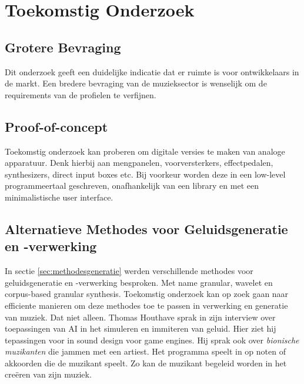 \section{Toekomstig Onderzoek}

\subsection{Grotere Bevraging}

Dit onderzoek geeft een duidelijke indicatie dat er ruimte is voor ontwikkelaars in de markt. Een bredere bevraging van de muzieksector is wenselijk om de requirements van de profielen te verfijnen.

\subsection{Proof-of-concept}

Toekomstig onderzoek kan proberen om digitale versies te maken van analoge apparatuur. Denk hierbij aan mengpanelen, voorversterkers, effectpedalen, synthesizers, direct input boxes etc. Bij voorkeur worden deze in een low-level programmeertaal geschreven, onafhankelijk van een library en met een minimalistische user interface.

\subsection{Alternatieve Methodes voor Geluidsgeneratie en -verwerking}

In sectie \ref{sec:methodesgeneratie} werden verschillende methodes voor geluidsgeneratie en -verwerking besproken. Met name granular, wavelet en corpus-based granular synthesis. Toekomstig onderzoek kan op zoek gaan naar efficiente manieren om deze methodes toe te passen in verwerking en generatie van muziek. Dat niet alleen. Thomas Houthave sprak in zijn interview over toepassingen van AI in het simuleren en immiteren van geluid. Hier ziet hij tepassingen voor in sound design voor game engines. \autocite{thomas houthave} Hij sprak ook over \textit{bionische muzikanten} die jammen met een artiest. Het programma speelt in op noten of akkoorden die de muzikant speelt. Zo kan de muzikant begeleid worden in het creëren van zijn muziek.

\iffalse \lipsum[76-80] \fi

